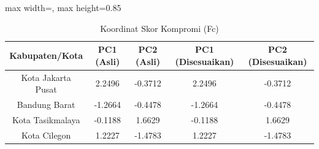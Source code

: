 \begin{table}[H]
\centering
\caption{Koordinat Skor Kompromi (Fc)} \label{tab:samplescores}
\begin{adjustbox}{max width=\textwidth, max height=0.85\textheight}
\begin{tabular}{|c|c|c|c|c|}
\hline
\textbf{Kabupaten/Kota} & \textbf{PC1 (Asli)} & \textbf{PC2 (Asli)} & \textbf{PC1 (Disesuaikan)} & \textbf{PC2 (Disesuaikan)} \\
\hline
Kota Jakarta Pusat & 2.2496 & -0.3712 & 2.2496 & -0.3712 \\
Bandung Barat & -1.2664 & -0.4478 & -1.2664 & -0.4478 \\
Kota Tasikmalaya & -0.1188 & 1.6629 & -0.1188 & 1.6629 \\
Kota Cilegon & 1.2227 & -1.4783 & 1.2227 & -1.4783 \\
\hline
\end{tabular}
\end{adjustbox}
\end{table}